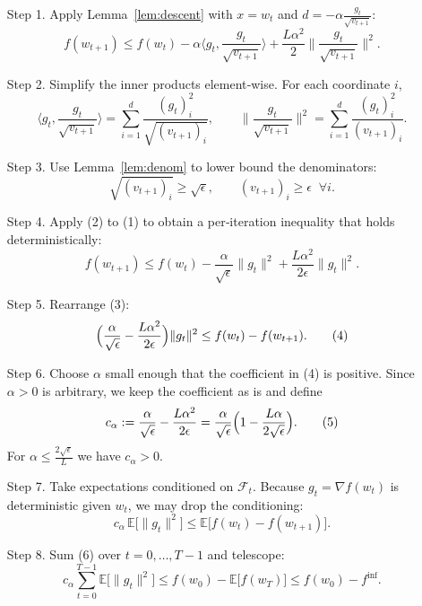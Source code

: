 \documentclass[11pt]{article}
\begin{document}
\begin{enumerate}
\item[Step 1.] Apply Lemma~\ref{lem:descent} with $x=w_t$ and
$d=-\alpha \frac{g_t}{\sqrt{v_{t+1}}}$:
\[
f(w_{t+1})\le f(w_t)-\alpha\Big\langle g_t,\frac{g_t}{\sqrt{v_{t+1}}}\Big\rangle
+\frac{L\alpha^{2}}{2}\Big\|\frac{g_t}{\sqrt{v_{t+1}}}\Big\|^{2}.
\tag{1}
\]

\item[Step 2.] Simplify the inner products element‑wise.
For each coordinate $i$,
\[
\Big\langle g_t,\frac{g_t}{\sqrt{v_{t+1}}}\Big\rangle
= \sum_{i=1}^{d}\frac{(g_t)_i^{2}}{\sqrt{(v_{t+1})_i}},\qquad
\Big\|\frac{g_t}{\sqrt{v_{t+1}}}\Big\|^{2}
= \sum_{i=1}^{d}\frac{(g_t)_i^{2}}{(v_{t+1})_i}.
\]

\item[Step 3.] Use Lemma~\ref{lem:denom} to lower bound the denominators:
\[
\sqrt{(v_{t+1})_i}\ge \sqrt{\epsilon},\qquad
(v_{t+1})_i\ge \epsilon\;\;\forall i.
\tag{2}
\]

\item[Step 4.] Apply (2) to (1) to obtain a per‑iteration inequality that holds
deterministically:
\[
f(w_{t+1}) \le f(w_t)
-\frac{\alpha}{\sqrt{\epsilon}}\|g_t\|^{2}
+\frac{L\alpha^{2}}{2\epsilon}\|g_t\|^{2}.
\tag{3}
\]

\item[Step 5.] Rearrange (3):
\[
\Bigl(\frac{\alpha}{\sqrt{\epsilon}}-\frac{L\alpha^{2}}{2\epsilon}\Bigr)
\|g_t\|^{2}
\le f(w_t)-f(w_{t+1}).
\tag{4}
\]

\item[Step 6.] Choose $\alpha$ small enough that the coefficient in (4) is
positive.  Since $\alpha>0$ is arbitrary, we keep the coefficient as is and
define
\[
c_{\alpha}:=\frac{\alpha}{\sqrt{\epsilon}}-\frac{L\alpha^{2}}{2\epsilon}
= \frac{\alpha}{\sqrt{\epsilon}}\Bigl(1-\frac{L\alpha}{2\sqrt{\epsilon}}\Bigr).
\tag{5}
\]
For $\alpha\le\frac{2\sqrt{\epsilon}}{L}$ we have $c_{\alpha}>0$.

\item[Step 7.] Take expectations conditioned on $\mathcal{F}_t$.
Because $g_t=\nabla f(w_t)$ is deterministic given $w_t$, we may drop the
conditioning:
\[
c_{\alpha}\,\mathbb{E}\!\bigl[\|g_t\|^{2}\bigr]
\le \mathbb{E}\!\bigl[f(w_t)-f(w_{t+1})\bigr].
\tag{6}
\]

\item[Step 8.] Sum (6) over $t=0,\dots,T-1$ and telescope:
\[
c_{\alpha}\sum_{t=0}^{T-1}\mathbb{E}\!\bigl[\|g_t\|^{2}\bigr]
\le f(w_0)-\mathbb{E}\!\bigl[f(w_T)\bigr]
\le f(w_0)-f^{\inf}.
\tag{7}
\]


\end{enumerate}
\end{document}

